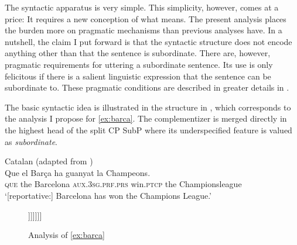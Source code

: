 The syntactic apparatus is very simple. This simplicity, however, comes at a price: It requires a new conception of what  means.  The present analysis places the burden more on pragmatic mechanisms than  previous analyses have. In a nutshell, the claim I put forward is that the syntactic structure does not encode anything other than that the sentence is subordinate.  There are, however, pragmatic requirements for uttering a subordinate sentence. Its use is only felicitous if there is a salient linguistic expression that the sentence can be subordinate to.  These pragmatic conditions are described  in greater details in .


The basic syntactic idea is illustrated in the structure   in , which  corresponds to the analysis I propose for \eqref{ex:barca}. The complementizer is  merged directly in the highest head of the split CP SubP where its underspecified feature is valued as \emph{subordinate}.\largerpage


 \ea \label{ex:barca} 
 Catalan (adapted from \citealt[34]{DemonteSoriano2014})\\ 
 \gll Que el Barça ha guanyat la Champeons. \\
	\textsc{que} the Barcelona  \textsc{aux.3sg.prf.prs} win.\textsc{ptcp} the Championsleague  \\
	\glt `[reportative:] Barcelona has won the Champions League.'
\z

\begin{figure}
\caption{\label{struc:barca}Analysis of \eqref{ex:barca}}
\begin{forest}
	[SubP
	[~] 
	[Sub' 
	[Sub$^0$\\Que\textsubscript{subordinate}, name=sub]  
	[\dots
	[,phantom]
	[FinP
	[~] 
	[Fin' 
	[Fin$^0$, name=fin] 
	[IP
	[el Barça ha guanyat\\ la Champeons.,roof]
	]]]]]]
\end{forest}
\end{figure}

